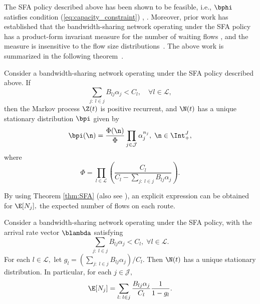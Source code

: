 The SFA policy described above has been shown to be feasible, i.e.,
$\bphi$ satisfies condition (\ref{eq:capacity_constraint}) \cite[Corollary 2]{kelly2009resource},
\cite[Lemma 4.1]{walton2009fairness}. Moreover, prior work has established
that the bandwidth-sharing network operating under the SFA policy
has a product-form invariant measure for the number of waiting
flows \cite{bonald2003insensitive,walton2009fairness,kelly2009resource,zachary2007insensitivity}, and the measure is insensitive to the flow size distributions~\cite{zachary2007insensitivity,walton2009fairness}. The above work is summarized in the following theorem~\cite[Theorem 4.1]{shah2014SFA}.
\begin{thm}
\label{thm:SFA} Consider a bandwidth-sharing network operating under
the SFA policy described above. If
\[
\sum_{j:\;l\in j}B_{lj}\alpha_{j}<C_{l},\quad\forall l\in\mathcal{L},
\]
then the Markov process $\Z(t)$ is positive
recurrent, and $\N(t)$ has a unique stationary distribution $\bpi$ given by
\[
\bpi(\n)=\frac{\Phi(\n)}{\Phi}\prod_{j\in\mathcal{J}}\alpha_{j}^{n_{j}},\;\n\in\Int_{+}^{J}, \label{eq:SFA_distribution}
\]
 where 
\[
\Phi=\prod_{l\in\mathcal{L}}\left(\frac{C_{l}}{C_{l}-\sum_{j:\;l\in j}B_{lj}\alpha_{j}}\right).
\]

\end{thm}
By using Theorem \ref{thm:SFA} (also see \cite[Propositions 4.2 and 4.3]{shah2014SFA}),
an explicit expression can be obtained for $\E[N_{j}],$  the expected number of flows on each route.
\begin{prop}
\label{prop:delay_BN}Consider a bandwidth-sharing network operating
under the SFA policy, with the arrival rate vector $\blambda$ satisfying
$$\sum_{j:\;l\in j}B_{lj}\alpha_j<C_{l},\;\forall l\in\mathcal{L}.$$
For each $l\in\mathcal{L},$ let $g_{l}=\left(\sum_{j:\;l\in j}B_{lj}\alpha_j\right)/C_{l}.$
Then $\N(t)$ has a unique stationary distribution. In particular,
for each $j\in\mathcal{J},$ 
\[
\E[N_{j}]=\sum_{l:\;l\in j}\frac{B_{lj}\alpha_j}{C_{l}}\frac{1}{1-g_{l}}.
\]
\end{prop}

